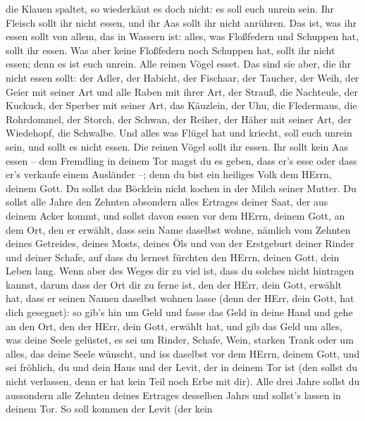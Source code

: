 die Klauen spaltet, so wiederkäut es doch nicht: es soll euch unrein
sein. Ihr Fleisch sollt ihr nicht essen, und ihr Aas sollt ihr nicht
anrühren.  Das ist, was ihr essen sollt von allem, das in
Wassern ist: alles, was Floßfedern und Schuppen hat, sollt ihr essen.
 Was aber keine Floßfedern noch Schuppen hat, sollt ihr
nicht essen; denn es ist euch unrein.  Alle reinen Vögel
esset.  Das sind sie aber, die ihr nicht essen sollt: der
Adler, der Habicht, der Fischaar,  der Taucher, der Weih,
der Geier mit seiner Art  und alle Raben mit ihrer Art,
 der Strauß, die Nachteule, der Kuckuck, der Sperber mit
seiner Art,  das Käuzlein, der Uhu, die Fledermaus,
 die Rohrdommel, der Storch, der Schwan,  der
Reiher, der Häher mit seiner Art, der Wiedehopf, die Schwalbe.
 Und alles was Flügel hat und kriecht, soll euch unrein
sein, und sollt es nicht essen.  Die reinen Vögel sollt ihr
essen.  Ihr sollt kein Aas essen -- dem Fremdling in deinem
Tor magst du es geben, dass er's esse oder dass er's verkaufe einem
Ausländer --; denn du bist ein heiliges Volk dem HErrn, deinem Gott. Du
sollst das Böcklein nicht kochen in der Milch seiner Mutter.
 Du sollst alle Jahre den Zehnten absondern alles Ertrages
deiner Saat, der aus deinem Acker kommt,  und sollst davon
essen vor dem HErrn, deinem Gott, an dem Ort, den er erwählt, dass sein
Name daselbst wohne, nämlich vom Zehnten deines Getreides, deines Mosts,
deines Öls und von der Erstgeburt deiner Rinder und deiner Schafe, auf
dass du lernest fürchten den HErrn, deinen Gott, dein Leben lang.
 Wenn aber des Weges dir zu viel ist, dass du solches nicht
hintragen kannst, darum dass der Ort dir zu ferne ist, den der HErr,
dein Gott, erwählt hat, dass er seinen Namen daselbst wohnen lasse (denn
der HErr, dein Gott, hat dich gesegnet):  so gib's hin um
Geld und fasse das Geld in deine Hand und gehe an den Ort, den der HErr,
dein Gott, erwählt hat,  und gib das Geld um alles, was
deine Seele gelüstet, es sei um Rinder, Schafe, Wein, starken Trank oder
um alles, das deine Seele wünscht, und iss daselbst vor dem HErrn,
deinem Gott, und sei fröhlich, du und dein Haus  und der
Levit, der in deinem Tor ist (den sollst du nicht verlassen, denn er hat
kein Teil noch Erbe mit dir).  Alle drei Jahre sollst du
aussondern alle Zehnten deines Ertrages desselben Jahrs und sollst's
lassen in deinem Tor.  So soll kommen der Levit (der kein
